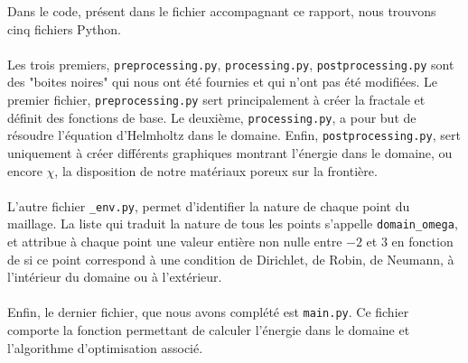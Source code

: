 Dans le code, présent dans le fichier accompagnant ce rapport, nous trouvons cinq fichiers Python. \\ \\
Les trois premiers, \texttt{preprocessing.py}, \texttt{processing.py}, \texttt{postprocessing.py} sont des "boites noires" qui nous ont été fournies et qui n'ont pas été modifiées. Le premier fichier, \texttt{preprocessing.py} sert principalement à créer la fractale et définit des fonctions de base. Le deuxième, \texttt{processing.py}, a pour but de résoudre l'équation d'Helmholtz dans le domaine. Enfin, \texttt{postprocessing.py}, sert uniquement à créer différents graphiques montrant l'énergie dans le domaine, ou encore $\chi$, la disposition de notre matériaux poreux sur la frontière.\\ \\
L'autre fichier \texttt{\_env.py}, permet d'identifier la nature de chaque point du maillage. La liste qui traduit la nature de tous les points s'appelle \texttt{domain\_omega}, et attribue à chaque point une valeur entière non nulle entre $-2$ et $3$ en fonction de si ce point correspond à une condition de Dirichlet, de Robin, de Neumann, à l'intérieur du domaine ou à l'extérieur.\\ \\
Enfin, le dernier fichier, que nous avons complété est \texttt{main.py}. Ce fichier comporte la fonction permettant de calculer l'énergie dans le domaine et l'algorithme d'optimisation associé.
